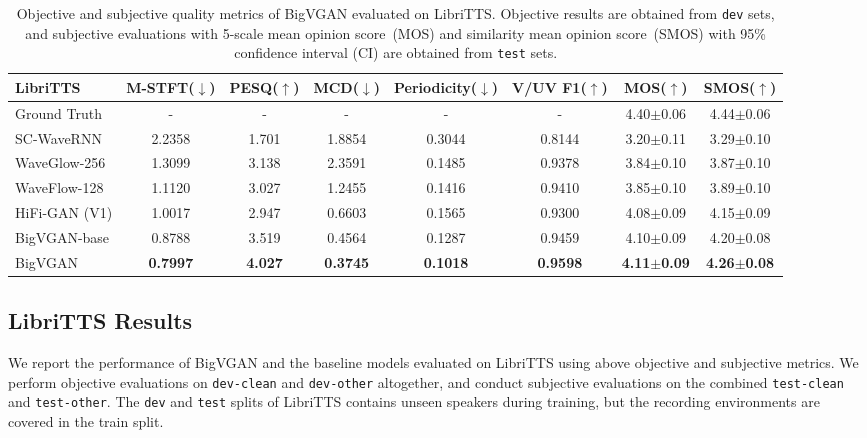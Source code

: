 \documentclass{article} \usepackage{iclr2023_conference,times}
\theoremstyle{plain}
\theoremstyle{definition}
\theoremstyle{remark}
\begin{document}
\begin{table*}[t]
\vspace{-.2cm}
\caption{\footnotesize 
Objective and subjective quality metrics of BigVGAN evaluated on LibriTTS. Objective results are obtained from \texttt{dev} sets, and subjective evaluations with 5-scale mean opinion score~(MOS) and similarity mean opinion score~(SMOS) with 95\% confidence interval (CI) are obtained from \texttt{test} sets.}
\label{tab:libritts-all}
\vspace{-0.3cm}
\begin{center}
\begin{small}
\begin{adjustbox}{width=1.01\textwidth}
\begin{tabular}{l|ccccc|cc}
\toprule
LibriTTS   & M-STFT($\downarrow$) & PESQ($\uparrow$) & MCD($\downarrow$) & Periodicity($\downarrow$) & V/UV F1($\uparrow$) & MOS($\uparrow$) & SMOS($\uparrow$) \\
\midrule
Ground Truth &  - & - & - & - & - & 4.40$\pm$0.06 & 4.44$\pm$0.06 \\
\midrule
SC-WaveRNN & 2.2358 & 1.701 & 1.8854 & 0.3044 & 0.8144 & 3.20$\pm$0.11 & 3.29$\pm$0.10 \\
WaveGlow-256 & 1.3099 & 3.138 & 2.3591 & 0.1485 & 0.9378 & 3.84$\pm$0.10 & 3.87$\pm$0.10 \\
WaveFlow-128 & 1.1120 & 3.027 & 1.2455 & 0.1416 & 0.9410 & 3.85$\pm$0.10 & 3.89$\pm$0.10 \\
HiFi-GAN (V1)  & 1.0017 & 2.947 & 0.6603 & 0.1565 & 0.9300 & 4.08$\pm$0.09 & 4.15$\pm$0.09 \\
\midrule
BigVGAN-base  & 0.8788 & 3.519 & 0.4564 & 0.1287 & 0.9459 & 4.10$\pm$0.09 & 4.20$\pm$0.08 \\
BigVGAN     & \textbf{0.7997} & \textbf{4.027} & \textbf{0.3745} & \textbf{0.1018} & \textbf{0.9598} & \textbf{4.11$\pm$0.09} & \textbf{4.26$\pm$0.08} \\
\bottomrule
\end{tabular}
\end{adjustbox}
\end{small}
\end{center}
\vskip -0.15in
\end{table*}


\vspace{-.2cm}
\subsection{LibriTTS Results}
\label{libritts-result}
\vspace{-.1cm}
We report the performance of BigVGAN and the baseline models evaluated on LibriTTS using above objective and subjective metrics.
We perform objective evaluations on \texttt{dev-clean} and \texttt{dev-other} altogether, and conduct subjective evaluations on the combined \texttt{test-clean} and \texttt{test-other}. The \texttt{dev} and \texttt{test} splits of LibriTTS contains unseen speakers during training, but the recording environments are covered in the train split.
\end{document}
